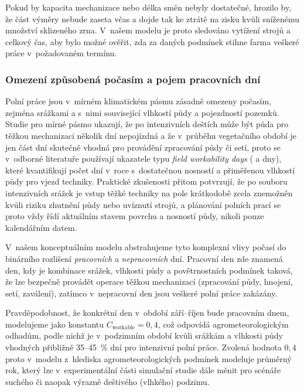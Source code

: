 \documentclass[11pt,a4paper]{article}
\begin{document}
Pokud by kapacita mechanizace nebo délka směn nebyly dostatečné, hrozilo by, že část výměry nebude zaseta včas a dojde tak ke ztrátě na zisku kvůli sníženému množství sklizeného zrna. V~našem modelu je proto sledováno vytížení strojů a celkový čas, aby bylo možné ověřit, zda za daných podmínek stihne farma veškeré práce v~požadovaném termínu.

\subsubsection{Omezení způsobená počasím a pojem pracovních dní}\label{workable-days}

Polní práce jsou v~mírném klimatickém pásmu zásadně omezeny počasím, zejména srážkami a s~nimi související vlhkostí půdy a pojezdností pozemků. Studie pro mírné pásmo ukazují, že po intenzivních deštích může být půda pro těžkou mechanizaci několik dní nepojízdná a že v~průběhu vegetačního období je jen část dní skutečně vhodná pro provádění zpracování půdy či setí, proto se v~odborné literatuře používají ukazatele typu \emph{field workability days} ( a  dny), které kvantifikují počet dní v~roce s~dostatečnou nosností a přiměřenou vlhkostí půdy pro vjezd techniky\cite{workable-days}. Praktické zkušenosti přitom potvrzují, že po souboru intenzivních srážek je vstup těžké techniky na pole krátkodobě zcela znemožněn kvůli riziku zhutnění půdy nebo uvíznutí strojů, a plánování polních prací se proto vždy řídí aktuálním stavem povrchu a nosností půdy, nikoli pouze kalendářním datem.

V~našem konceptuálním modelu abstrahujeme tyto komplexní vlivy počasí do binárního rozlišení \emph{pracovních} a \emph{nepracovních} dní. Pracovní den zde znamená den, kdy je kombinace srážek, vlhkosti půdy a povětrnostních podmínek taková, že lze bezpečně provádět operace těžkou mechanizací (zpracování půdy, hnojení, setí, zaválení), zatímco v~nepracovní den jsou veškeré polní práce zakázány. 

Pravděpodobnost, že konkrétní den v~období září--říjen bude pracovním dnem, modelujeme jako konstantu $C_{\text{workable}} = 0,4$, což odpovídá agrometeorologickým odhadům, podle nichž je v~podzimním období kvůli srážkám a vlhkosti půdy vhodných přibližně 35--45~\% dní pro intenzivní polní práce. Zvolená hodnota $0,4$ proto v~modelu z~hlediska agrometeorologických podmínek modeluje průměrný rok\cite{workable-days}, který lze v~experimentální části simulační studie dále měnit pro scénáře suchého či naopak výrazně deštivého (vlhkého) podzimu.
\end{document}
